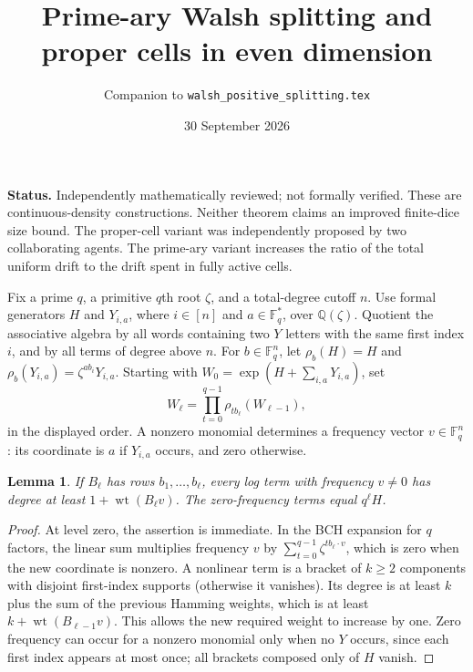 \documentclass[11pt]{article}
\title{Prime-ary Walsh splitting and proper cells in even dimension}
\author{Companion to \texttt{walsh\_positive\_splitting.tex}}
\date{30 September 2026}
\newtheorem{lemma}[theorem]{Lemma}
\newcommand{\wt}{\operatorname{wt}}
\begin{document}
\maketitle
\noindent\textbf{Status.} Independently mathematically reviewed;
not formally verified. These are continuous-density
constructions. Neither theorem claims an improved finite-dice size bound.
The proper-cell variant was independently proposed by two collaborating
agents. The prime-ary variant increases the ratio of the total uniform
drift to the drift spent in fully active cells.

Fix a prime $q$, a primitive $q$th root $\zeta$, and a total-degree
cutoff $n$. Use formal generators $H$ and $Y_{i,a}$, where $i\in[n]$
and $a\in\mathbb F_q^*$, over $\mathbb Q(\zeta)$. Quotient the
associative algebra by all words containing two $Y$ letters with the
same first index $i$, and by all terms of degree above $n$. For
$b\in\mathbb F_q^n$, let $\rho_b(H)=H$ and
$\rho_b(Y_{i,a})=\zeta^{ab_i}Y_{i,a}$.
Starting with $W_0=\exp(H+\sum_{i,a}Y_{i,a})$, set
\[
 W_\ell=\prod_{t=0}^{q-1}\rho_{t b_\ell}(W_{\ell-1}),
\]
in the displayed order.
A nonzero monomial determines a frequency vector $v\in\mathbb F_q^n$:
its coordinate is $a$ if $Y_{i,a}$ occurs, and zero otherwise.

\begin{lemma}\label{filter}
If $B_\ell$ has rows $b_1,\ldots,b_\ell$, every log term with frequency
$v\ne0$ has degree at least $1+\wt(B_\ell v)$. The zero-frequency
terms equal $q^\ell H$.
\end{lemma}
\begin{proof}
At level zero, the assertion is immediate. In the BCH expansion for
$q$ factors, the linear sum multiplies frequency $v$ by
$\sum_{t=0}^{q-1}\zeta^{t b_\ell\cdot v}$, which is zero when the new
coordinate is nonzero. A nonlinear term is a bracket of $k\ge2$
components with disjoint first-index supports (otherwise it vanishes).
Its degree is at least $k$ plus the sum of the previous Hamming weights,
which is at least $k+\wt(B_{\ell-1}v)$. This allows the new required
weight to increase by one. Zero frequency can occur for a nonzero
monomial only when no $Y$ occurs, since each first index appears at most
once; all brackets composed only of $H$ vanish.
\end{proof}
\end{document}
